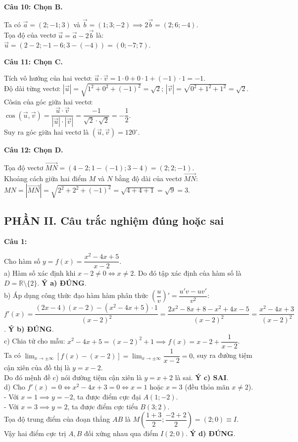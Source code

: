 \documentclass[12pt,a4paper]{article}
\newcommand{\loigiai}[1]{\par\medskip\Needspace{4\baselineskip}\noindent\textbf{#1}\par\nobreak}
\begin{document}
\loigiai{Câu 10: Chọn B.}
Ta có $\vec{a}=(2;-1;3)$ và $\vec{b}=(1;3;-2) \implies 2\vec{b}=(2;6;-4)$.\\
Tọa độ của vectơ $\vec{u}=\vec{a}-2\vec{b}$ là:\\
$\vec{u}=(2-2;-1-6;3-(-4))=(0;-7;7)$.

\loigiai{Câu 11: Chọn C.}
Tích vô hướng của hai vectơ: $\vec{u}\cdot\vec{v}=1\cdot 0+0\cdot 1+(-1)\cdot 1=-1$.\\
Độ dài từng vectơ: $|\vec{u}|=\sqrt{1^2+0^2+(-1)^2}=\sqrt{2}$; \quad $|\vec{v}|=\sqrt{0^2+1^2+1^2}=\sqrt{2}$.\\
Côsin của góc giữa hai vectơ:\\
$\cos(\vec{u},\vec{v})=\dfrac{\vec{u}\cdot\vec{v}}{|\vec{u}|\cdot|\vec{v}|}=\dfrac{-1}{\sqrt{2}\cdot\sqrt{2}}=-\dfrac{1}{2}$.\\
Suy ra góc giữa hai vectơ là $(\vec{u},\vec{v})=120^\circ$.

\loigiai{Câu 12: Chọn D.}
Tọa độ vectơ $\vec{MN}=(4-2;1-(-1);3-4)=(2;2;-1)$.\\
Khoảng cách giữa hai điểm $M$ và $N$ bằng độ dài của vectơ $\vec{MN}$:\\
$MN=|\vec{MN}|=\sqrt{2^2+2^2+(-1)^2}=\sqrt{4+4+1}=\sqrt{9}=3$.

\subsection*{PHẦN II. Câu trắc nghiệm đúng hoặc sai}

\loigiai{Câu 1:}
Cho hàm số $y=f(x)=\dfrac{x^2-4x+5}{x-2}$.\\
a) Hàm số xác định khi $x-2\ne 0 \iff x\ne 2$. Do đó tập xác định của hàm số là $D=\mathbb{R}\setminus\{2\}$. \textbf{Ý a) ĐÚNG}.\\
b) Áp dụng công thức đạo hàm hàm phân thức $\left(\dfrac{u}{v}\right)'=\dfrac{u'v-uv'}{v^2}$:\\
$f'(x)=\dfrac{(2x-4)(x-2)-(x^2-4x+5)\cdot 1}{(x-2)^2}=\dfrac{2x^2-8x+8-x^2+4x-5}{(x-2)^2}=\dfrac{x^2-4x+3}{(x-2)^2}$. \textbf{Ý b) ĐÚNG}.\\
c) Chia tử cho mẫu: $x^2-4x+5=(x-2)^2+1 \implies f(x)=x-2+\dfrac{1}{x-2}$.\\
Ta có $\lim_{x\to \pm\infty}[f(x)-(x-2)]=\lim_{x\to \pm\infty}\dfrac{1}{x-2}=0$, suy ra đường tiệm cận xiên của đồ thị là $y=x-2$.\\
Do đó mệnh đề c) nói đường tiệm cận xiên là $y=x+2$ là sai. \textbf{Ý c) SAI}.\\
d) Cho $f'(x)=0 \iff x^2-4x+3=0 \iff x=1$ hoặc $x=3$ (đều thỏa mãn $x\ne 2$).\\
- Với $x=1 \implies y=-2$, ta được điểm cực đại $A(1;-2)$.\\
- Với $x=3 \implies y=2$, ta được điểm cực tiểu $B(3;2)$.\\
Tọa độ trung điểm của đoạn thẳng $AB$ là $M\left(\dfrac{1+3}{2};\dfrac{-2+2}{2}\right)=(2;0)\equiv I$.\\
Vậy hai điểm cực trị $A, B$ đối xứng nhau qua điểm $I(2;0)$. \textbf{Ý d) ĐÚNG}.
\end{document}
